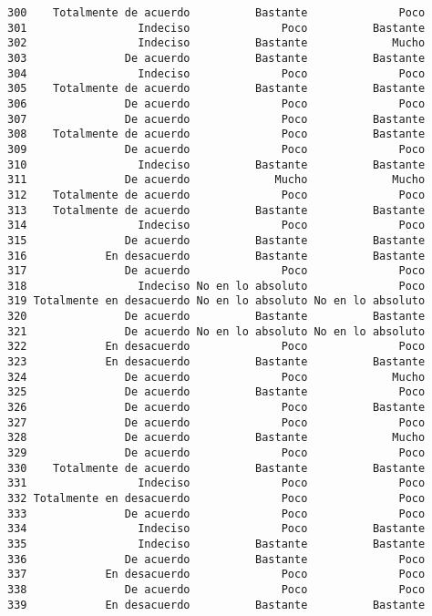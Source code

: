 \documentclass[
  letterpaper,
  DIV=11,
  numbers=noendperiod]{scrartcl}
\begin{document}
\begin{verbatim}
300    Totalmente de acuerdo          Bastante              Poco
301                 Indeciso              Poco          Bastante
302                 Indeciso          Bastante             Mucho
303               De acuerdo          Bastante          Bastante
304                 Indeciso              Poco              Poco
305    Totalmente de acuerdo          Bastante          Bastante
306               De acuerdo              Poco              Poco
307               De acuerdo              Poco          Bastante
308    Totalmente de acuerdo              Poco          Bastante
309               De acuerdo              Poco              Poco
310                 Indeciso          Bastante          Bastante
311               De acuerdo             Mucho             Mucho
312    Totalmente de acuerdo              Poco              Poco
313    Totalmente de acuerdo          Bastante          Bastante
314                 Indeciso              Poco              Poco
315               De acuerdo          Bastante          Bastante
316            En desacuerdo          Bastante          Bastante
317               De acuerdo              Poco              Poco
318                 Indeciso No en lo absoluto              Poco
319 Totalmente en desacuerdo No en lo absoluto No en lo absoluto
320               De acuerdo          Bastante          Bastante
321               De acuerdo No en lo absoluto No en lo absoluto
322            En desacuerdo              Poco              Poco
323            En desacuerdo          Bastante          Bastante
324               De acuerdo              Poco             Mucho
325               De acuerdo          Bastante              Poco
326               De acuerdo              Poco          Bastante
327               De acuerdo              Poco              Poco
328               De acuerdo          Bastante             Mucho
329               De acuerdo              Poco              Poco
330    Totalmente de acuerdo          Bastante          Bastante
331                 Indeciso              Poco              Poco
332 Totalmente en desacuerdo              Poco              Poco
333               De acuerdo              Poco              Poco
334                 Indeciso              Poco          Bastante
335                 Indeciso          Bastante          Bastante
336               De acuerdo          Bastante              Poco
337            En desacuerdo              Poco              Poco
338               De acuerdo              Poco              Poco
339            En desacuerdo          Bastante          Bastante

\end{verbatim}
\end{document}
